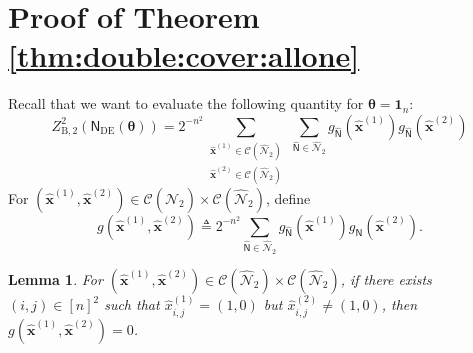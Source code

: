 \documentclass[conference]{IEEEtran}
\theoremstyle{plain}
\newtheorem{lem}[thm]{Lemma}
\theoremstyle{definition}
\newcommand{\B}{\mathrm{B}}
\newcommand{\sfn}{\mathsf{N}}
\newcommand{\hatx}[1]{\widehat{x}_{ #1 }}
\newcommand{\hatbfx}[1][]{\widehat{\mathbf{x}}^{ #1 }}
\newcommand{\btheta}{\boldsymbol{\theta}}
\newcommand{\defeq}{\triangleq}
\newcommand{\sfnDE}{\sfn_{\mathrm{DE}}}
\newcommand{\validc}{\mathcal {C}(\widehat{\mathcal N}_2)}
\begin{document}
 \section{Proof of Theorem \ref{thm:double:cover:allone}}\label{appx:double:cover:allone}
 Recall that we want to evaluate the following quantity for $\btheta=\mathbf 1_n$:
 \[
  Z_{\B,2}^2(\sfnDE(\btheta))=2^{-n^2}
  \sum_{\substack{\hatbfx[(1)]\in \validc\\\hatbfx[(2)]\in \validc}} \,
  \sum_{\widehat{\sfn}\in\widehat{\mathcal N}_2}
  g_{\widehat{\sfn}}(\hatbfx[(1)])g_{\widehat{\sfn}}(\hatbfx[(2)])\]
 For $(\hatbfx[(1)],\hatbfx[(2)])\in \validc\times \validc$, define
 \[
  g(\hatbfx[(1)],\hatbfx[(2)])\defeq
  2^{-n^2}\sum_{\widehat{\sfn}\in\widehat{\mathcal N}_2}
  g_{\widehat{\sfn}}(\hatbfx[(1)])g_{\widehat{\sfn}}(\hatbfx[(2)]).
 \]

 \begin{lem}
  For $(\hatbfx[(1)],\hatbfx[(2)])\in \validc\times \validc$, if there exists $(i,j)\in[n]^2$
  such that $\hatx{i,j}^{(1)}=(1,0)$ but $\hatx{i,j}^{(2)}\neq (1,0)$, then $g(\hatbfx[(1)],\hatbfx[(2)])=0$.
 \end{lem}
\end{document}
